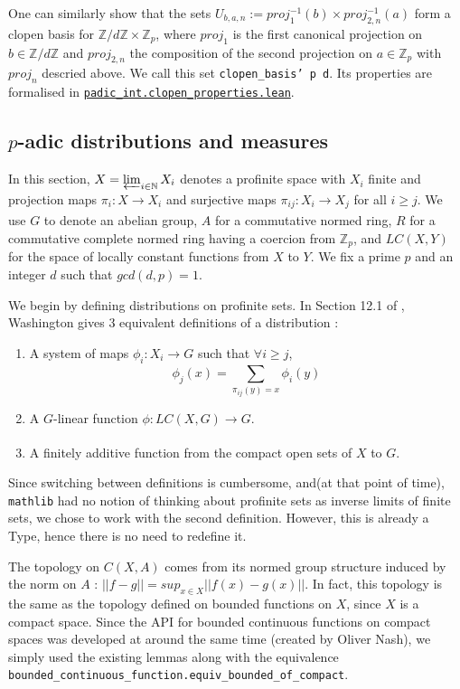 \documentclass[a4paper,UKenglish,cleveref, autoref, thm-restate]{lipics-v2021}
\newcommand{\lean}[1]{\texttt{#1}\xspace} %
\begin{document}
One can similarly show that the sets $U_{b, a, n} := proj_1^{-1} (b) \times proj_{2,n} ^{-1} (a)$ form a clopen basis for 
$\mathbb{Z} / d \mathbb{Z} \times \mathbb{Z}_p$, where $proj_1$ is the first canonical projection on $b \in \mathbb{Z} / d \mathbb{Z}$ 
and $proj_{2,n}$ the composition of the second projection on $a \in \mathbb{Z}_p$ with $proj_n$ descried above. We call this set 
\lean{clopen\_basis' p d}. Its properties are formalised in \href{https://github.com/laughinggas/p-adic-L-functions/blob/main/src/padic_int/clopen_properties.lean}{\lean{padic\_int.clopen\_properties.lean}}.

\subsection{$p$-adic distributions and measures}
In this section, $X = \varprojlim_{i \in \mathbb{N}} X_i$ denotes a profinite space with $X_i$ finite and
projection maps $\pi_i : X \xrightarrow[]{} X_i$ and surjective maps
$\pi_{ij} : X_i \xrightarrow[]{} X_j$ for all $i \ge j$. We use $G$ to denote an abelian group,
$A$ for a commutative normed ring, $R$ for a commutative complete normed ring having a coercion from $\mathbb{Z}_p$, 
and $LC(X,Y)$ for the space of locally constant functions from $X$ to $Y$. 
We fix a prime $p$ and an integer $d$ such that $gcd(d, p) =1$. 

We begin by defining distributions on profinite sets. In Section 12.1 of \cite{cyc}, Washington
gives 3 equivalent definitions of a distribution :
\begin{enumerate}
  \item A system of maps $\phi_i : X_i \xrightarrow[]{} G$ such that $\forall i \ge j$,
  $$ \phi_j(x) = \sum_{\pi_{ij}(y) = x} \phi_i(y) $$
  \item A $G$-linear function $\phi : LC(X, G) \xrightarrow[]{} G$.
  \item A finitely additive function from the compact open sets of $X$ to $G$.
\end{enumerate}

Since switching between definitions is cumbersome, and(at that point of time), \lean{mathlib}
had no notion of thinking about profinite sets as inverse limits of finite sets, we chose to work
with the second definition. However, this is already a Type, hence there is no need to redefine it.

The topology on $C(X, A)$ comes from its normed group structure induced by the norm on $A$ :
$|| f - g || = sup_{x \in X} || f(x) - g(x) ||$. In fact, this topology is the same as the 
topology defined on bounded functions on $X$, since $X$ is a compact space. Since the API for bounded 
continuous functions on compact spaces was developed at around the same time (created by Oliver Nash), 
we simply used the existing lemmas along with the equivalence 
\lean{bounded\_continuous\_function.equiv\_bounded\_of\_compact}. 
\end{document}
